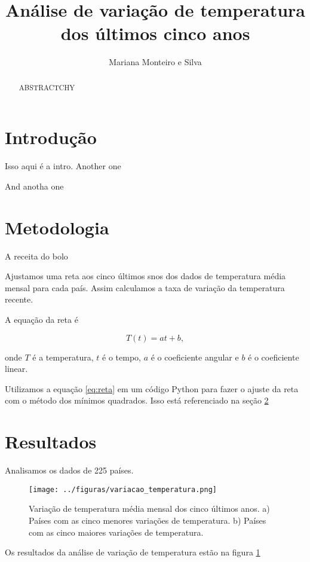 \documentclass{article} %
\begin{document}
\title{Análise de variação de temperatura dos últimos cinco anos}
\author{Mariana Monteiro e Silva}
\maketitle



\begin{abstract}
ABSTRACTCHY

\end{abstract}

\section{Introdução}
\label{sec:intro}
Isso aqui é a intro.
Another one

And anotha one

\section{Metodologia}
\label{sec:metodos}

A receita do bolo

Ajustamos uma reta aos cinco últimos snos dos dados
de temperatura média mensal para cada país.
Assim calculamos a taxa de variação da temperatura recente.

A equação da reta é

\begin{equation}
T(t) = at + b,
\label{eq:reta}
\end{equation}

\noindent
onde $T$ é a temperatura, $t$ é o tempo, $a$ é o coeficiente angular 
e $b$ é o coeficiente linear.

Utilizamos a equação \ref{eq:reta} em um código Python para fazer 
o ajuste da reta com o método dos mínimos quadrados. Isso está referenciado na seção \ref{sec:metodos}

\section{Resultados}
\label{sec:resultados}

Analisamos os dados de 225 países.

\begin{figure}
	\centering
	\texttt{[image: ../figuras/variacao\_temperatura.png]}
	\caption{
		Variação de temperatura média mensal dos cinco últimos anos.
		a) Países com as cinco menores variações de temperatura.
		b) Países com as cinco maiores variações de temperatura.
	}
\label{fig:variacao}
\end{figure}


Os resultados da análise de variação de temperatura estão na figura \ref{fig:variacao}
\end{document}
